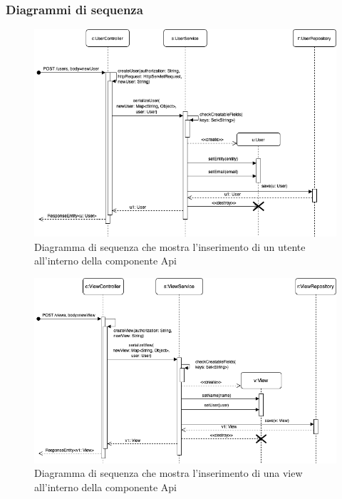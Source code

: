 \begin{landscape}
	\subsubsection{Diagrammi di sequenza}%
		\begin{figure}[H]
			\centering
			\includegraphics[scale=0.550]{res/images/API/inserimento_utente.png}
			\caption{Diagramma di sequenza che mostra l'inserimento di un utente all'interno della componente Api}
			\label{Diagramma 17}
		\end{figure}
		\begin{figure}[H]
			\centering
			\includegraphics[scale=0.550]{res/images/API/inserimento_view.png}
			\caption{Diagramma di sequenza che mostra l'inserimento di una view all'interno della componente Api}
			\label{Diagramma 18}
		\end{figure}
	\end{landscape}

